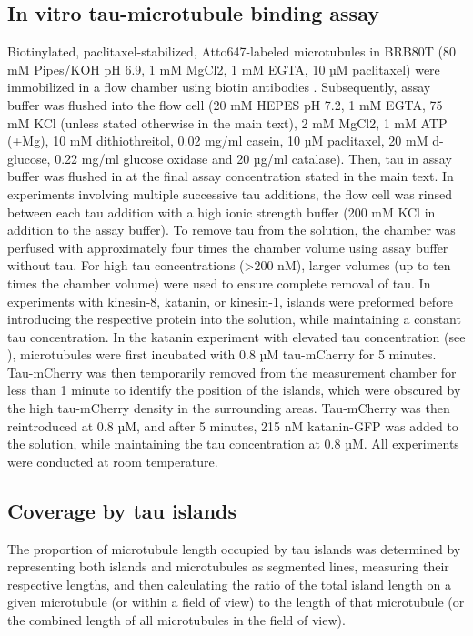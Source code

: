 \subsection{In vitro tau-microtubule binding assay}
Biotinylated, paclitaxel-stabilized, Atto647-labeled microtubules in BRB80T (80 mM Pipes/KOH pH 6.9, 1 mM MgCl2, 1 mM EGTA, 10 µM paclitaxel) were immobilized in a flow chamber using biotin antibodies . Subsequently, assay buffer was flushed into the flow cell (20 mM HEPES pH 7.2, 1 mM EGTA, 75 mM KCl (unless stated otherwise in the main text), 2 mM MgCl2, 1 mM ATP (+Mg), 10 mM dithiothreitol, 0.02 mg/ml casein, 10 µM paclitaxel, 20 mM d-glucose, 0.22 mg/ml glucose oxidase and 20 µg/ml catalase). Then, tau in assay buffer was flushed in at the final assay concentration stated in the main text. In experiments involving multiple successive tau additions, the flow cell was rinsed between each tau addition with a high ionic strength buffer (200 mM KCl in addition to the assay buffer). To remove tau from the solution, the chamber was perfused with approximately four times the chamber volume using assay buffer without tau. For high tau concentrations (>200 nM), larger volumes (up to ten times the chamber volume) were used to ensure complete removal of tau. In experiments with kinesin-8, katanin, or kinesin-1, islands were preformed before introducing the respective protein into the solution, while maintaining a constant tau concentration. In the katanin experiment with elevated tau concentration (see ), microtubules were first incubated with 0.8 µM tau-mCherry for 5 minutes. Tau-mCherry was then temporarily removed from the measurement chamber for less than 1 minute to identify the position of the islands, which were obscured by the high tau-mCherry density in the surrounding areas. Tau-mCherry was then reintroduced at 0.8 µM, and after 5 minutes, 215 nM katanin-GFP was added to the solution, while maintaining the tau concentration at 0.8 µM. All experiments were conducted at room temperature.


\subsection{Coverage by tau islands}
The proportion of microtubule length occupied by tau islands was determined by representing both islands and microtubules as segmented lines, measuring their respective lengths, and then calculating the ratio of the total island length on a given microtubule (or within a field of view) to the length of that microtubule (or the combined length of all microtubules in the field of view).

